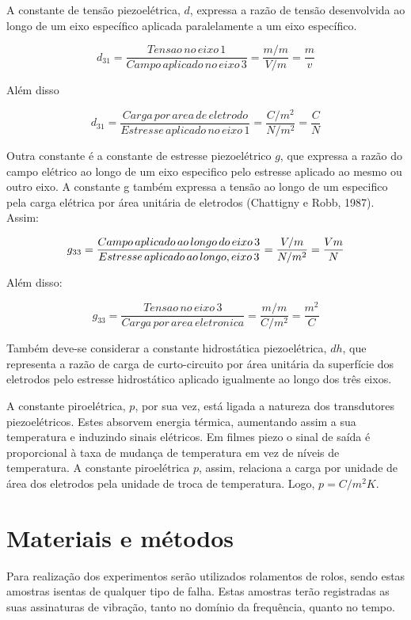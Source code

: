 \documentclass[
	12pt,				
	oneside,			
	a4paper,			
	english,			
	brazil				
	]{abntex2ppgsi}
\begin{document}
A constante de tensão piezoelétrica, $d$, expressa a razão de tensão desenvolvida ao longo de um eixo específico aplicada paralelamente a um eixo específico. 

\[d_{31} = \frac{Tensao \,no \,eixo \,1}{Campo \,aplicado \,no \,eixo \,3} = \frac{m/m}{V/m} = \frac{m}{v} \]

Além disso

\[d_{31} = \frac{Carga \,por \,area \,de \,eletrodo}{Estresse \,aplicado \,no \,eixo \,1} = \frac{C/m^{2}}{N/m^{2}} = \frac{C}{N} \]

Outra constante é a constante de estresse piezoelétrico $g$, que expressa a razão do campo elétrico ao longo de um eixo especifico pelo estresse aplicado ao mesmo ou outro eixo. A constante g também expressa a tensão ao longo de um especifico pela carga elétrica por área unitária de eletrodos (Chattigny e Robb, 1987). Assim:

\[g_{33} = \frac{Campo \,aplicado \,ao \,longo \,do \,eixo \,3}{Estresse \,aplicado \,ao \,longo ,\do \,eixo \,3} = \frac{V/m}{N/m^{2}} = \frac{Vm}{N} \]

Além disso:

\[g_{33} = \frac{Tensao \,no \,eixo \,3}{Carga \,por \,area \,eletronica} = \frac{m/m}{C/m^{2}} = \frac{m^{2}}{C} \]

Também deve-se considerar a constante hidrostática piezoelétrica, $dh$, que representa a razão de carga de curto-circuito por área unitária da superfície dos eletrodos pelo estresse hidrostático aplicado igualmente ao longo dos três eixos. 

A constante piroelétrica, $p$, por sua vez, está ligada a natureza dos transdutores piezoelétricos. Estes absorvem energia térmica, aumentando assim a sua temperatura e induzindo sinais elétricos. Em filmes piezo o sinal de saída é proporcional à taxa de mudança de temperatura em vez de níveis de temperatura. A constante piroelétrica $p$, assim, relaciona a carga por unidade de área dos eletrodos pela unidade de troca de temperatura. Logo, $p = C/m^{2} K$.

\chapter{Materiais e métodos}

Para realização dos experimentos serão utilizados rolamentos de rolos, sendo estas amostras isentas de qualquer tipo de falha. Estas amostras terão registradas as suas assinaturas de vibração, tanto no domínio da frequência, quanto no tempo.
\end{document}
